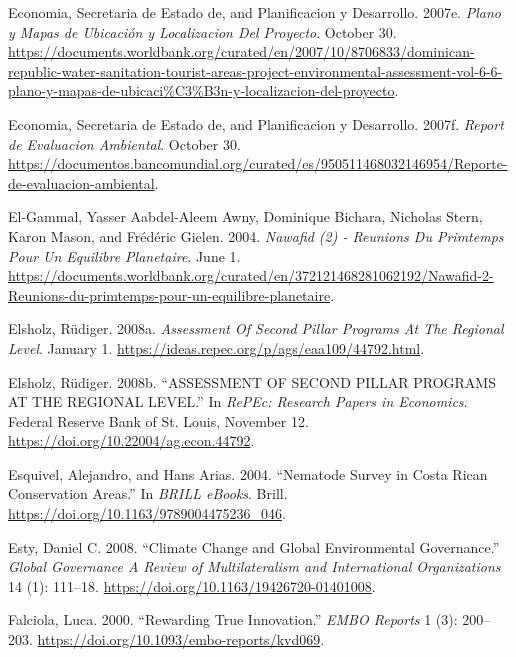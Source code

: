 \begin{CSLReferences}{1}{1}
Economia, Secretaria de Estado de, and Planificacion y Desarrollo.
2007e. \emph{Plano y Mapas de Ubicación y Localizacion Del Proyecto}.
October 30.
\url{https://documents.worldbank.org/curated/en/2007/10/8706833/dominican-republic-water-sanitation-tourist-areas-project-environmental-assessment-vol-6-6-plano-y-mapas-de-ubicaci\%C3\%B3n-y-localizacion-del-proyecto}.

Economia, Secretaria de Estado de, and Planificacion y Desarrollo.
2007f. \emph{Report de Evaluacion Ambiental}. October 30.
\url{https://documentos.bancomundial.org/curated/es/950511468032146954/Reporte-de-evaluacion-ambiental}.

El-Gammal, Yasser Aabdel-Aleem Awny, Dominique Bichara, Nicholas Stern,
Karon Mason, and Frédéric Gielen. 2004. \emph{Nawafid (2) - Reunions Du
Primtemps Pour Un Equilibre Planetaire}. June 1.
\url{https://documents.worldbank.org/curated/en/372121468281062192/Nawafid-2-Reunions-du-primtemps-pour-un-equilibre-planetaire}.

Elsholz, Rüdiger. 2008a. \emph{Assessment Of Second Pillar Programs At
The Regional Level}. January 1.
\url{https://ideas.repec.org/p/ags/eaa109/44792.html}.

Elsholz, Rüdiger. 2008b. {``ASSESSMENT OF SECOND PILLAR PROGRAMS AT THE
REGIONAL LEVEL.''} In \emph{RePEc: Research Papers in Economics}.
Federal Reserve Bank of St. Louis, November 12.
\url{https://doi.org/10.22004/ag.econ.44792}.

Esquivel, Alejandro, and Hans Arias. 2004. {``Nematode Survey in Costa
Rican Conservation Areas.''} In \emph{BRILL eBooks}. Brill.
\url{https://doi.org/10.1163/9789004475236_046}.

Esty, Daniel C. 2008. {``Climate Change and Global Environmental
Governance.''} \emph{Global Governance A Review of Multilateralism and
International Organizations} 14 (1): 111--18.
\url{https://doi.org/10.1163/19426720-01401008}.

Falciola, Luca. 2000. {``Rewarding True Innovation.''} \emph{EMBO
Reports} 1 (3): 200--203.
\url{https://doi.org/10.1093/embo-reports/kvd069}.


\end{CSLReferences}
